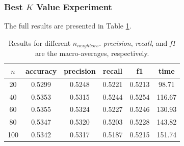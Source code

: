 \documentclass[times, twocolumn]{article}
\begin{document}
\subsubsection{Best $K$ Value Experiment}
The full results are presented in Table \ref{table:result}.
\begin{table}
    \begin{center}
        \begin{tabular}{|c||c|c|c|c|c|} \hline
           $n$ & accuracy & precision & recall & f1 & time   \\
           \hline
            20  & 0.5299 & 0.5248 & 0.5221 & 0.5213 & 98.71  \\
            40  & 0.5353 & 0.5315 & 0.5244 & 0.5254 & 116.67 \\
            60  & 0.5355 & 0.5324 & 0.5227 & 0.5246 & 130.93 \\
            80  & 0.5347 & 0.5320 & 0.5203 & 0.5228 & 143.82 \\
            100 & 0.5342 & 0.5317 & 0.5187 & 0.5215 & 151.74 \\
            \hline
        \end{tabular}
        \caption{Results for different $n_{neighbors}$. \textit{precision}, \textit{recall}, and \textit{f1} are the macro-averages, respectively.}
        \label{table:result}
    \end{center}
\end{table}
\end{document}
